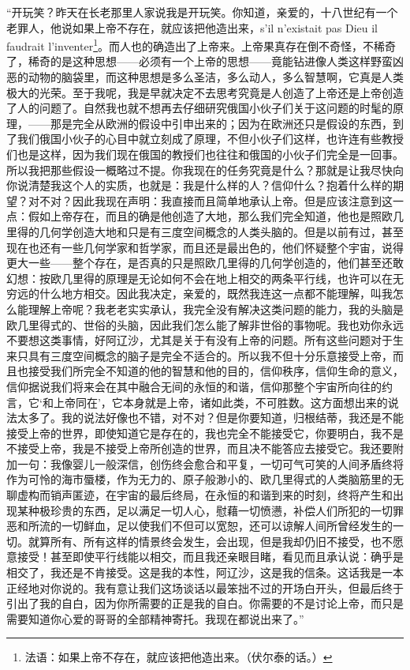 \par “开玩笑？昨天在长老那里人家说我是开玩笑。你知道，亲爱的，十八世纪有一个老罪人，他说如果上帝不存在，就应该把他造出来，s’il n’existait pas Dieu il faudrait l’inventer\footnote{法语：如果上帝不存在，就应该把他造出来。（伏尔泰的话。）}。而人也的确造出了上帝来。上帝果真存在倒不奇怪，不稀奇了，稀奇的是这种思想——必须有一个上帝的思想——竟能钻进像人类这样野蛮凶恶的动物的脑袋里，而这种思想是多么圣洁，多么动人，多么智慧啊，它真是人类极大的光荣。至于我呢，我是早就决定不去思考究竟是人创造了上帝还是上帝创造了人的问题了。自然我也就不想再去仔细研究俄国小伙子们关于这问题的时髦的原理，——那是完全从欧洲的假设中引申出来的；因为在欧洲还只是假设的东西，到了我们俄国小伙子的心目中就立刻成了原理，不但小伙子们这样，也许连有些教授们也是这样，因为我们现在俄国的教授们也往往和俄国的小伙子们完全是一回事。所以我把那些假设一概略过不提。你我现在的任务究竟是什么？那就是让我尽快向你说清楚我这个人的实质，也就是：我是什么样的人？信仰什么？抱着什么样的期望？对不对？因此我现在声明：我直接而且简单地承认上帝。但是应该注意到这一点：假如上帝存在，而且的确是他创造了大地，那么我们完全知道，他也是照欧几里得的几何学创造大地和只是有三度空间概念的人类头脑的。但是以前有过，甚至现在也还有一些几何学家和哲学家，而且还是最出色的，他们怀疑整个宇宙，说得更大一些——整个存在，是否真的只是照欧几里得的几何学创造的，他们甚至还敢幻想：按欧几里得的原理是无论如何不会在地上相交的两条平行线，也许可以在无穷远的什么地方相交。因此我决定，亲爱的，既然我连这一点都不能理解，叫我怎么能理解上帝呢？我老老实实承认，我完全没有解决这类问题的能力，我的头脑是欧几里得式的、世俗的头脑，因此我们怎么能了解非世俗的事物呢。我也劝你永远不要想这类事情，好阿辽沙，尤其是关于有没有上帝的问题。所有这些问题对于生来只具有三度空间概念的脑子是完全不适合的。所以我不但十分乐意接受上帝，而且也接受我们所完全不知道的他的智慧和他的目的，信仰秩序，信仰生命的意义，信仰据说我们将来会在其中融合无间的永恒的和谐，信仰那整个宇宙所向往的约言，它‘和上帝同在’，它本身就是上帝，诸如此类，不可胜数。这方面想出来的说法太多了。我的说法好像也不错，对不对？但是你要知道，归根结蒂，我还是不能接受上帝的世界，即使知道它是存在的，我也完全不能接受它，你要明白，我不是不接受上帝，我是不接受上帝所创造的世界，而且决不能答应去接受它。我还要附加一句：我像婴儿一般深信，创伤终会愈合和平复，一切可气可笑的人间矛盾终将作为可怜的海市蜃楼，作为无力的、原子般渺小的、欧几里得式的人类脑筋里的无聊虚构而销声匿迹，在宇宙的最后终局，在永恒的和谐到来的时刻，终将产生和出现某种极珍贵的东西，足以满足一切人心，慰藉一切愤懑，补偿人们所犯的一切罪恶和所流的一切鲜血，足以使我们不但可以宽恕，还可以谅解人间所曾经发生的一切。就算所有、所有这样的情景终会发生，会出现，但是我却仍旧不接受，也不愿意接受！甚至即使平行线能以相交，而且我还亲眼目睹，看见而且承认说：确乎是相交了，我还是不肯接受。这是我的本性，阿辽沙，这是我的信条。这话我是一本正经地对你说的。我有意让我们这场谈话以最笨拙不过的开场白开头，但最后终于引出了我的自白，因为你所需要的正是我的自白。你需要的不是讨论上帝，而只是需要知道你心爱的哥哥的全部精神寄托。我现在都说出来了。”
